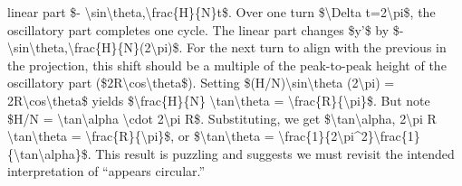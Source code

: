 \documentclass[]{article}
\begin{document}
linear part \$-
\textbackslash{}sin\textbackslash{}theta,\textbackslash{}frac\{H\}\{N\}t\$.
Over one turn \$\textbackslash{}Delta t=2\textbackslash{}pi\$, the
oscillatory part completes one cycle. The linear part changes \$y'\$ by
\$-
\textbackslash{}sin\textbackslash{}theta,\textbackslash{}frac\{H\}\{N\}(2\textbackslash{}pi)\$.
For the next turn to align with the previous in the projection, this
shift should be a multiple of the peak-to-peak height of the oscillatory
part (\$2R\textbackslash{}cos\textbackslash{}theta\$). Setting
\$\textbar{}(H/N)\textbackslash{}sin\textbackslash{}theta\textbar{}
(2\textbackslash{}pi) = 2R\textbackslash{}cos\textbackslash{}theta\$
yields \$\textbackslash{}frac\{H\}\{N\}
\textbackslash{}tan\textbackslash{}theta =
\textbackslash{}frac\{R\}\{\textbackslash{}pi\}\$. But note \$H/N =
\textbackslash{}tan\textbackslash{}alpha \textbackslash{}cdot
2\textbackslash{}pi R\$. Substituting, we get
\$\textbackslash{}tan\textbackslash{}alpha, 2\textbackslash{}pi R
\textbackslash{}tan\textbackslash{}theta =
\textbackslash{}frac\{R\}\{\textbackslash{}pi\}\$, or
\$\textbackslash{}tan\textbackslash{}theta =
\textbackslash{}frac\{1\}\{2\textbackslash{}pi\^{}2\}\textbackslash{}frac\{1\}\{\textbackslash{}tan\textbackslash{}alpha\}\$.
This result is puzzling and suggests we must revisit the intended
interpretation of ``appears circular.''
\end{document}
